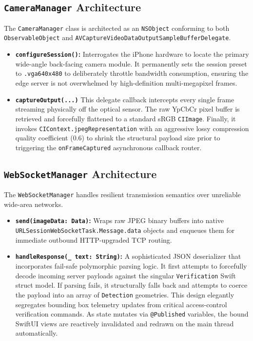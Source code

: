 \subsection{\texttt{CameraManager} Architecture}
The \texttt{CameraManager} class is architected as an \texttt{NSObject} conforming to both \texttt{ObservableObject} and \texttt{AVCaptureVideoDataOutputSampleBufferDelegate}. 
\begin{itemize}
    \item \textbf{\texttt{configureSession()}:} Interrogates the iPhone hardware to locate the primary wide-angle back-facing camera module. It permanently sets the session preset to \texttt{.vga640x480} to deliberately throttle bandwidth consumption, ensuring the edge server is not overwhelmed by high-definition multi-megapixel frames.
    \item \textbf{\texttt{captureOutput(...)}} This delegate callback intercepts every single frame streaming physically off the optical sensor. The raw YpCbCr pixel buffer is retrieved and forcefully flattened to a standard sRGB \texttt{CIImage}. Finally, it invokes \texttt{CIContext.jpegRepresentation} with an aggressive lossy compression quality coefficient ($0.6$) to shrink the structural payload size prior to triggering the \texttt{onFrameCaptured} asynchronous callback router.
\end{itemize}

\subsection{\texttt{WebSocketManager} Architecture}
The \texttt{WebSocketManager} handles resilient transmission semantics over unreliable wide-area networks.
\begin{itemize}
    \item \textbf{\texttt{send(imageData: Data)}:} Wraps raw JPEG binary buffers into native \texttt{URLSessionWebSocketTask.Message.data} objects and enqueues them for immediate outbound HTTP-upgraded TCP routing.
    \item \textbf{\texttt{handleResponse(\_ text: String)}:} A sophisticated JSON deserializer that incorporates fail-safe polymorphic parsing logic. It first attempts to forcefully decode incoming server payloads against the singular \texttt{Verification} Swift struct model. If parsing fails, it structurally falls back and attempts to coerce the payload into an array of \texttt{Detection} geometries. This design elegantly segregates bounding box telemetry updates from critical access-control verification commands. As state mutates via \texttt{@Published} variables, the bound SwiftUI views are reactively invalidated and redrawn on the main thread automatically.
\end{itemize}

